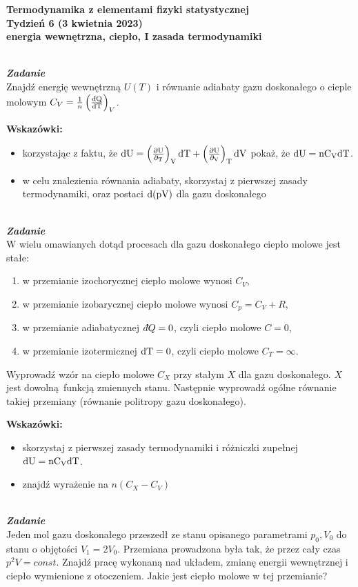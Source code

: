 \documentclass[11pt,a4paper]{article}
\newcounter{zadanie}\newcommand{\zadanie}[1][]{\addtocounter{zadanie}{1} ~\\  {\bf \emph{Zadanie \arabic{zadanie} #1 }} \\}
\newcommand{\dbar}{{\mkern3mu\mathchar'26\mkern-12mu d}}
\begin{document}

\begin{centering}
\bf{\Large{Termodynamika z elementami fizyki statystycznej}}\\
Tydzień 6  (3 kwietnia 2023)\\[3mm]
energia wewnętrzna, ciepło, I zasada termodynamiki \\ 
\end{centering} 
\vspace{5mm}

\zadanie
Znajdź energię wewnętrzną $U(T)$ i równanie adiabaty gazu doskonałego o cieple molowym
$C_V = \frac{1}{n}\left( \frac{\rm{\dbar}Q}{\rm{d}T}\right)_V$.

\textbf{Wskazówki:}
\begin{itemize}
  \item korzystając z faktu, że
    $\rm{d}U = \left(\frac{\partial U}{\partial_T}\right)_V \rm{d}T + \left(\frac{\partial U}{\partial_V}\right)_T \rm{d}V$
    pokaż, że $\rm{d}U = n C_V \rm{d}T$.
  \item w celu znalezienia równania adiabaty, skorzystaj z pierwszej zasady termodynamiki,
    oraz postaci $\rm{d}(pV)$ dla gazu doskonałego\\
\end{itemize}
\zadanie
W wielu omawianych dotąd procesach dla gazu doskonałego ciepło molowe jest stałe:
\begin{enumerate}
\item w przemianie izochorycznej ciepło molowe wynosi $C_V$,
\item w przemianie izobarycznej ciepło molowe wynosi $C_p = C_V + R$,
\item w przemianie adiabatycznej $\dbar Q = 0$, czyli ciepło molowe $C = 0$,
\item w przemianie izotermicznej $\rm{d}T = 0$, czyli ciepło molowe $C_T = \infty$.
\end{enumerate}
Wyprowadź wzór na ciepło molowe $C_X$ przy stałym $X$ dla gazu doskonałego.
$X$ jest dowolną funkcją zmiennych stanu. Następnie wyprowadź ogólne równanie 
takiej przemiany (równanie politropy gazu doskonałego).

\textbf{Wskazówki:}
\begin{itemize}
\item skorzystaj z pierwszej zasady termodynamiki i różniczki zupełnej $\rm{d}U = n C_V \rm{d}T$.
\item znajdź wyrażenie na $n(C_X - C_V)$
\end{itemize}
\zadanie
Jeden mol gazu doskonałego przeszedł ze stanu opisanego parametrami
$p_0, V_0$ do stanu o objętości $V_1 = 2 V_0$.
Przemiana prowadzona była tak, że przez cały czas $p^2 V = const$.
Znajdź pracę wykonaną nad układem, zmianę energii wewnętrznej i ciepło wymienione z otoczeniem.
Jakie jest ciepło molowe w tej przemianie?
\end{document}

